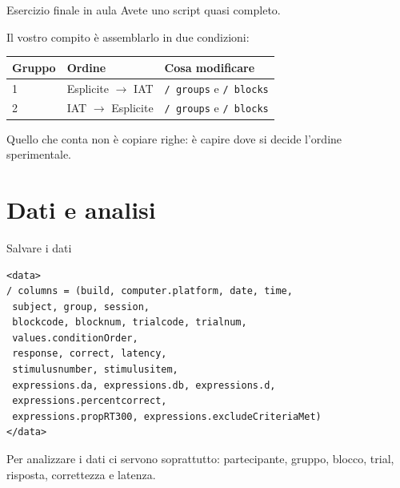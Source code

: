 \documentclass[compress]{beamer}
\begin{document}
\begin{frame}{Esercizio finale in aula}
Avete uno script quasi completo.

\vspace{3mm}
Il vostro compito è assemblarlo in due condizioni:

\vspace{3mm}
\begin{center}
\begin{tabular}{lll}
\toprule
\textbf{Gruppo} & \textbf{Ordine} & \textbf{Cosa modificare} \\
\midrule
1 & Esplicite $\rightarrow$ IAT & \texttt{/ groups} e \texttt{/ blocks} \\
2 & IAT $\rightarrow$ Esplicite & \texttt{/ groups} e \texttt{/ blocks} \\
\bottomrule
\end{tabular}
\end{center}

\vspace{3mm}
Quello che conta non è copiare righe: è capire dove si decide l'ordine sperimentale.
\end{frame}

\section{Dati e analisi}

\begin{frame}[fragile]{Salvare i dati}
\begin{small}
\begin{Verbatim}[commandchars=\\\{\}]
<data>
/ columns = (build, computer.platform, date, time,
 subject, group, session,
 blockcode, blocknum, trialcode, trialnum,
 values.conditionOrder,
 response, correct, latency,
 stimulusnumber, stimulusitem,
 expressions.da, expressions.db, expressions.d,
 expressions.percentcorrect,
 expressions.propRT300, expressions.excludeCriteriaMet)
</data>
\end{Verbatim}
\end{small}

\vspace{2mm}
Per analizzare i dati ci servono soprattutto: partecipante, gruppo, blocco, trial, risposta, correttezza e latenza.
\end{frame}
\end{document}
